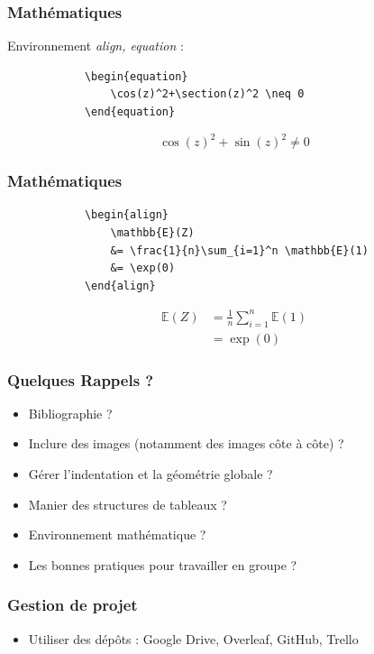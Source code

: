 \documentclass[handout]{beamer}
\begin{document}
	\begin{frame}[fragile=singleslide]
		\frametitle{Mathématiques}
		\centering
		Environnement \textit{align, equation} :
		\begin{verbatim}
			\begin{equation}
				\cos(z)^2+\section(z)^2 \neq 0
			\end{equation}
		\end{verbatim}

		\begin{equation}
			\cos(z)^2+\sin(z)^2 \neq 0
		\end{equation}


	\end{frame}

	\begin{frame}[fragile=singleslide]
		\frametitle{Mathématiques}
		\centering
		\begin{verbatim}
			\begin{align}
				\mathbb{E}(Z)
				&= \frac{1}{n}\sum_{i=1}^n \mathbb{E}(1)
				&= \exp(0)
			\end{align}
		\end{verbatim}

		\begin{align}
			\mathbb{E}(Z)
			&= \frac{1}{n}\sum_{i=1}^n \mathbb{E}(1)\\
			&= \exp(0)
		\end{align}

	\end{frame}

	\begin{frame}
		\frametitle{Quelques Rappels ?}
		\begin{itemize}
			\item Bibliographie ?
			\item Inclure des images (notamment des images côte à côte) ?
			\item Gérer l'indentation et la géométrie globale ?
			\item Manier des structures de tableaux ?
			\item Environnement mathématique ?
			\item Les bonnes pratiques pour travailler en groupe ?
		\end{itemize}
	\end{frame}

	\begin{frame}
		\frametitle{Gestion de projet}
		\begin{itemize}
			\item Utiliser des dépôts : Google Drive, Overleaf, GitHub, Trello
		\end{itemize}
	\end{frame}
\end{document}
